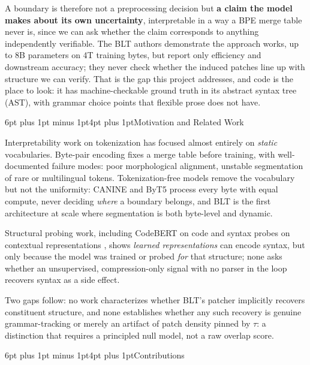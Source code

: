 \documentclass[10pt]{article}
\makeatletter
\renewcommand\section{\@startsection{section}{1}{0pt}%
  {6pt plus 1pt minus 1pt}{4pt plus 1pt}{\normalfont\large\bfseries}}
\makeatother
\begin{document}
A boundary is therefore not a preprocessing decision but \textbf{a claim the
model makes about its own uncertainty}, interpretable in a way a BPE merge
table never is, since we can ask whether the claim corresponds to anything
independently verifiable. The BLT authors demonstrate the approach works, up to
8B parameters on 4T training bytes, but report only efficiency and downstream
accuracy; they never check whether the induced patches line up with structure we
can verify. That is the gap this project addresses, and code is the place to
look: it has machine-checkable ground truth in its abstract syntax tree (AST),
with grammar choice points that flexible prose does not have.

\section{Motivation and Related Work}

Interpretability work on tokenization has focused almost entirely on
\emph{static} vocabularies. Byte-pair encoding \citep{sennrich2016bpe} fixes a
merge table before training, with well-documented failure modes: poor
morphological alignment, unstable segmentation of rare or multilingual tokens.
Tokenization-free models remove the vocabulary but not the uniformity: CANINE
\citep{clark2022canine} and ByT5 \citep{xue2022byt5} process every byte with
equal compute, never deciding \emph{where} a boundary belongs, and BLT is the
first architecture at scale where segmentation is both byte-level and dynamic.

Structural probing work, including CodeBERT \citep{feng2020codebert} on code
and syntax probes on contextual representations \citep{hewitt2019structural},
shows \emph{learned representations} can encode syntax, but only because the
model was trained or probed \emph{for} that structure; none asks whether an
unsupervised, compression-only signal with no parser in the loop recovers
syntax as a side effect.

Two gaps follow: no work characterizes whether BLT's patcher implicitly
recovers constituent structure, and none establishes whether any such recovery
is genuine grammar-tracking or merely an artifact of patch density pinned by
$\tau$: a distinction that requires a principled null model, not a raw
overlap score.

\section{Contributions}
\end{document}
